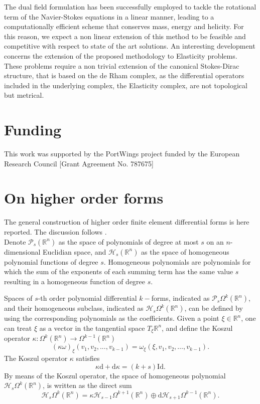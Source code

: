 \documentclass{elsarticle}
\renewcommand\d{\ensuremath{\mathrm{d}}}
\newcommand{\bbR}{\mathbb{R}}
\begin{document}
The dual field formulation has been successfully employed to tackle the rotational term of the Navier-Stokes equations in a linear manner, leading to a computationally efficient scheme that conserves mass, energy and helicity. For this reason, we expect a non linear extension of this method to be feasible and competitive with respect to state of the art solutions. An interesting development concerns the extension of the proposed methodology to Elasticity problems. These problems require a non trivial extension of the canonical Stokes-Dirac structure, that is based on the de Rham complex, as the differential operators included in the underlying complex, the Elasticity complex, are not topological but metrical.


\section*{Funding}

This work was supported by the PortWings project funded by the European Research Council [Grant Agreement No. 787675]




\appendix

\section{On higher order forms}\label{app:ho_feec}
The general construction of higher order finite element differential forms is here reported. The discussion follows \cite{wu2021hodgewave}. \\


Denote $\mathcal{P}_s(\bbR^n)$ as the space of polynomials of degree at most $s$ on an $n$-dimensional Euclidian space, and $\mathcal{H}_s(\bbR^n)$ as the space of homogeneous polynomial functions of degree $s$. Homogeneous polynomials are polynomials for which the sum of the exponents of each summing term has the same value $s$ resulting in a homogeneous function of degree $s$.

Spaces of $s$-th order polynomial differential $k-$forms, indicated as $\mathcal{P}_s\Omega^k(\bbR^n)$, and their homogeneous subclass, indicated as $\mathcal{H}_s \Omega^k(\bbR^n)$, can be defined by using the corresponding polynomials as the coefficients. Given a point $\xi \in \bbR^n$, one can treat $\xi$ as a vector in the tangential space $T_\xi\bbR^n$, and define the Koszul operator $\kappa : \Omega^k (\bbR^n) \rightarrow \Omega^{k - 1} (\bbR^n)$ 
\begin{equation}
    (\kappa\omega)_\xi(v_1, v_2, . . . , v_{k - 1}) = \omega_\xi(\xi, v_1, v_2, \dots, v_{k - 1}).
\end{equation}
The Koszul operator $\kappa$ satisfies \cite[Th. 3.1.]{arnold2006acta}
$$\kappa\d + \d\kappa = (k + s)\mathrm{Id}.$$
By means of the Koszul operator, the space of homogeneous polynomial $\mathcal{H}_s\Omega^k(\bbR^n)$, is written as the direct sum
\begin{equation}
    \mathcal{H}_s\Omega^k(\bbR^n) = \kappa \mathcal{H}_{s - 1}\Omega^{k+1}(\bbR^n) \oplus \d\mathcal{H}_{s+1}\Omega^{k - 1}(\bbR^n).
\end{equation}
\end{document}
